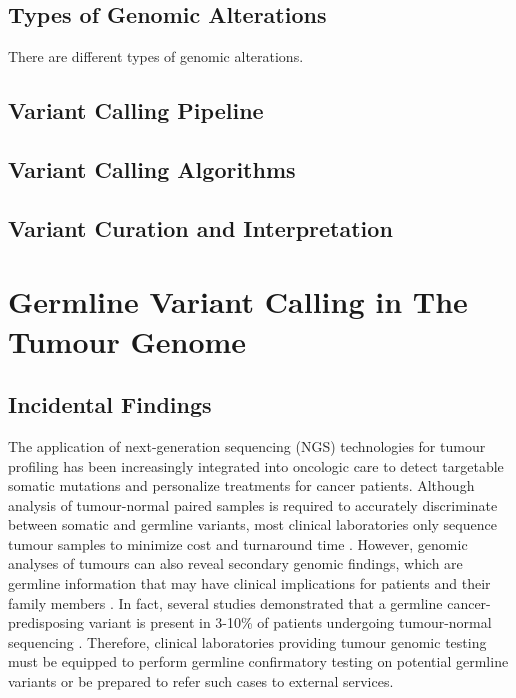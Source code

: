 \subsection{Types of Genomic Alterations}
There are different types of genomic alterations.

\subsection{Variant Calling Pipeline}

\subsection{Variant Calling Algorithms}

\subsection{Variant Curation and Interpretation}

\section{Germline Variant Calling in The Tumour Genome}
\label{sec:GermlineVariantCallinginTheTumourGenome}

\subsection{Incidental Findings}
The application of next-generation sequencing (NGS) technologies for tumour profiling has been increasingly integrated into oncologic care to detect targetable somatic mutations and personalize treatments for cancer patients. Although analysis of tumour-normal paired samples is required to accurately discriminate between somatic and germline variants, most clinical laboratories only sequence tumour samples to minimize cost and turnaround time \cite{Raymond2016}. However, genomic analyses of tumours can also reveal secondary genomic findings, which are germline information that may have clinical implications for patients and their family members \cite{Raymond2016}. In fact, several studies demonstrated that a germline cancer-predisposing variant is present in 3-10\% of patients undergoing tumour-normal sequencing \cite{Raymond2016,Meric-Bernstam2016,Schrader2015,Jones2015}. Therefore, clinical laboratories providing tumour genomic testing must be equipped to perform germline confirmatory testing on potential germline variants or be prepared to refer such cases to external services.

